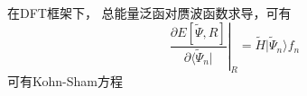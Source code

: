 {%
 
在\textrm{DFT}框架下，%
总能量泛函对赝波函数求导，可有
\begin{equation}
	\left.\dfrac{\partial E[\tilde\Psi, R]}{\partial\langle\tilde\Psi_n|}\right|_R=\tilde H|\tilde\Psi_n\rangle f_n
	\label{eq:PAW-Blochl-17}
\end{equation}
可有\textrm{Kohn-Sham}方程
}
